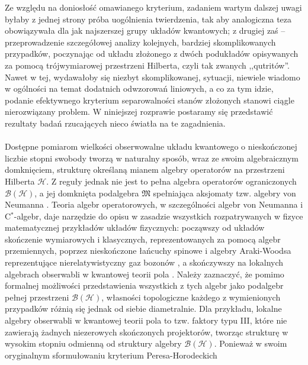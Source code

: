 Ze względu na doniosłość omawianego kryterium,
zadaniem wartym dalszej uwagi
byłaby z jednej strony próba uogólnienia twierdzenia,
tak aby analogiczna teza obowiązywała dla jak najszerszej grupy układów kwantowych;
z drugiej zaś -- przeprowadzenie szczegółowej analizy kolejnych,
bardziej skomplikowanych przypadków,
poczynając od układu złożonego z dwóch podukładów
opisywanych za pomocą trójwymiarowej przestrzeni Hilberta,
czyli tak zwanych ,,qutritów''.
Nawet w tej,
wydawałoby się niezbyt skomplikowanej,
sytuacji,
niewiele wiadomo w ogólności na temat dodatnich odwzorowań liniowych,
a co za tym idzie,
podanie efektywnego kryterium separowalności stanów złożonych stanowi
ciągle nierozwiązany problem.
W niniejszej rozprawie postaramy się przedstawić rezultaty badań
rzucających nieco światła na te zagadnienia.

\paragraph{}
\label{par:intro:02}
Dostępne pomiarom wielkości obserwowalne układu kwantowego o nieskończonej
liczbie stopni swobody tworzą w naturalny sposób,
wraz ze swoim algebraicznym domknięciem,
strukturę określaną mianem algebry operatorów na przestrzeni Hilberta
$\mathcal{H}$.
Z reguły jednak nie jest to pełna algebra operatorów ograniczonych
$\mathcal{B}(\mathcal{H})$,
a jej domknięta podalgebra $\mathfrak{M}$ spełniająca aksjomaty tzw.
algebry von Neumanna
\cite{Takesaki1}.
Teoria algebr operatorowych,
w szczególności algebr von Neumanna i \mbox{C$^{*}$-algebr},
daje narzędzie do opisu w zasadzie wszystkich rozpatrywanych
w fizyce matematycznej przykładów układów fizycznych:
począwszy od układów skończenie wymiarowych i klasycznych,
reprezentowanych za pomocą algebr przemiennych,
poprzez nieskończone łańcuchy spinowe i algebry Araki-Woodsa reprezentujące
nierelatywistyczny gaz bozonów
\cite{araki1968classification},
a skończywszy na lokalnych algebrach obserwabli w kwantowej teorii pola
\cite{Nielsen2010}.
Należy zaznaczyć,
że pomimo formalnej możliwości przedstawienia wszystkich z tych algebr jako
podalgebr pełnej przestrzeni $\mathcal{B}(\mathcal{H})$,
własności topologiczne każdego z wymienionych przypadków
różnią się jednak od siebie diametralnie.
Dla przykładu, lokalne algebry obserwabli w kwantowej teorii pola
to tzw. faktory typu III,
które nie zawierają żadnych niezerowych skończonych projektorów,
tworząc strukturę w wysokim stopniu odmienną od struktury algebry $\mathcal{B}(\mathcal{H})$.
Ponieważ w swoim oryginalnym sformułowaniu kryterium Peresa-Horodeckich

